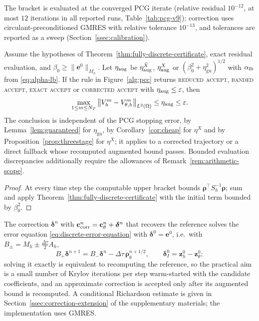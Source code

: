 \documentclass[hidelinks]{siamart251216}
\newcommand{\Mh}{M_h}
\newcommand{\Ah}{A_h}
\newcommand{\Sh}{S_h}
\newcommand{\norm}[1]{\left\lVert #1\right\rVert}
\newcommand{\dt}{\Delta\tau}
\newcommand{\etaGuar}{\eta_{\mathrm{gu}}}
\newcommand{\ee}{\mathbf e}
\newcommand{\cc}{\mathbf c}
\newcommand{\rr}{\bm\rho}
\newcommand{\zz}{\mathbf z}
\newcommand{\dd}{\bm\delta}
\begin{document}
The bracket is evaluated at the converged PCG iterate (relative residual $10^{-12}$, at most
$12$ iterations in all reported runs, Table~\ref{tab:pcg-v9}); correction uses circulant-preconditioned
GMRES with relative tolerance $10^{-13}$, and tolerances are reported as a sweep
(Section~\ref{ssec:calibration}).
\begin{proposition}
\label{prop:two-stage}
Assume the hypotheses of Theorem~\ref{thm:fully-discrete-certificate},
exact residual evaluation, and $\beta_0\ge\|\ee^0\|_{\Mh}$. Let $\eta_{\rm aug}$ be
$\eta^{\bar X}_{\rm aug}$, $\eta^X_{\rm aug}$ or $(\beta_0^2+\etaGuar^2)^{1/2}$ with $\alpha_{\rm lb}$ from \eqref{eq:alpha-lb}.
If the rule in Figure~\ref{alg:pcc} returns
\textsc{reduced accept}, \textsc{banded accept}, \textsc{exact accept} or \textsc{corrected accept} with $\eta_{\rm aug}\le\varepsilon$, then
\begin{equation}
  \max_{1\le m\le N_T}\norm{V_h^m-V_{\theta,h}^m}_{L^2(\Omega)}
  \le \eta_{\rm aug}\le\varepsilon .
  \label{eq:soundness}
\end{equation}
The conclusion is independent of the PCG stopping error, by Lemma~\ref{lem:guaranteed} for
$\etaGuar$, by Corollary~\ref{cor:cheap} for $\eta^X$ and by Proposition~\ref{prop:threestage} for $\eta^{\bar X}$;
it applies to a corrected trajectory or a direct fallback whose recomputed augmented bound passes.
Bounded evaluation discrepancies additionally require the allowances of Remark~\ref{rem:arithmetic-scope}.
\end{proposition}
\begin{proof}
At every time step the computable upper bracket bounds $\rr^\top\Sh^{-1}\rr$; sum and apply
Theorem~\ref{thm:fully-discrete-certificate} with the initial term bounded by $\beta_0^2$.
\end{proof}
The correction $\dd^n$ with $\cc^n_{\rm corr}=\cc_\theta^n+\dd^n$ that recovers the reference
solves the error equation \eqref{eq:discrete-error-equation} with $\dd^0=\ee^0$, i.e.\ with
$B_\pm=\Mh\pm\tfrac{\dt}{2}\Ah$,
\begin{equation}
  B_+\dd^{n+1}=B_-\dd^n-\dt\,\rr_\theta^{n+1/2},\qquad \dd^0_I=\zz_h^0-\zz_\theta^0;
  \label{eq:correction-step}
\end{equation}
solving it exactly is equivalent to recomputing the reference, so the practical aim is a small
number of Krylov iterations per step warm-started with the candidate coefficients, and an
approximate correction is accepted only after its augmented bound is recomputed.  A conditional
Richardson estimate is given in Section~\ref{ssec:correction-extension} of the supplementary
materials; the implementation uses GMRES.
\end{document}
